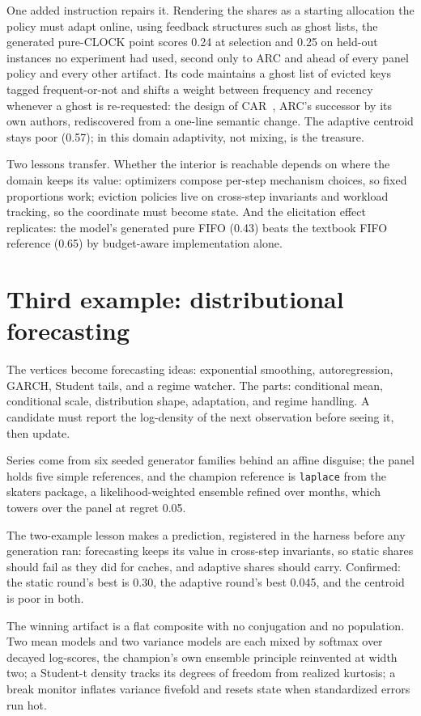 \documentclass[11pt]{article}
\begin{document}
One added instruction repairs it. Rendering the shares as a starting
allocation the policy must adapt online, using feedback structures such as
ghost lists, the generated pure-CLOCK point scores 0.24 at selection and
0.25 on held-out instances no experiment had used, second only to ARC and
ahead of every panel policy and every other artifact. Its code maintains a
ghost list of evicted keys tagged frequent-or-not and shifts a weight
between frequency and recency whenever a ghost is re-requested: the design
of CAR~\cite{bansal2004}, ARC's successor by its own authors, rediscovered
from a one-line semantic change. The adaptive centroid stays poor (0.57);
in this domain adaptivity, not mixing, is the treasure.

Two lessons transfer. Whether the interior is reachable depends on where
the domain keeps its value: optimizers compose per-step mechanism choices,
so fixed proportions work; eviction policies live on cross-step invariants
and workload tracking, so the coordinate must become state. And the
elicitation effect replicates: the model's generated pure FIFO (0.43) beats
the textbook FIFO reference (0.65) by budget-aware implementation alone.

\section{Third example: distributional forecasting}
\label{sec:forecast}

The vertices become forecasting ideas: exponential smoothing,
autoregression, GARCH, Student tails, and a regime watcher. The parts:
conditional mean, conditional scale, distribution shape, adaptation, and
regime handling. A candidate must report the log-density of the next
observation before seeing it, then update.

Series come from six seeded generator families behind an affine disguise;
the panel holds five simple references, and the champion reference is
\texttt{laplace} from the skaters package, a likelihood-weighted ensemble
refined over months, which towers over the panel at regret 0.05.

The two-example lesson makes a prediction, registered in the harness before
any generation ran: forecasting keeps its value in cross-step invariants,
so static shares should fail as they did for caches, and adaptive shares
should carry. Confirmed: the static round's best is 0.30, the adaptive
round's best 0.045, and the centroid is poor in both.

The winning artifact is a flat composite with no conjugation and no
population. Two mean models and two variance models are each mixed by
softmax over decayed log-scores, the champion's own ensemble principle
reinvented at width two; a Student-t density tracks its degrees of freedom
from realized kurtosis; a break monitor inflates variance fivefold and
resets state when standardized errors run hot.
\end{document}
